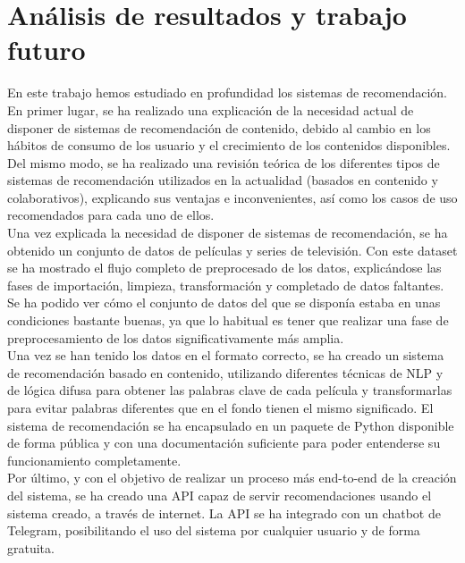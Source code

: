 \chapter{Análisis de resultados y trabajo futuro}\label{chap:resultados}

En este trabajo hemos estudiado en profundidad los sistemas de recomendación. En primer lugar, se ha realizado una explicación de la necesidad actual de disponer de sistemas de recomendación de contenido, debido al cambio en los hábitos de consumo de los usuario y el crecimiento de los contenidos disponibles. Del mismo modo, se ha realizado una revisión teórica de los diferentes tipos de sistemas de recomendación utilizados en la actualidad (basados en contenido y colaborativos), explicando sus ventajas e inconvenientes, así como los casos de uso recomendados para cada uno de ellos.\\

Una vez explicada la necesidad de disponer de sistemas de recomendación, se ha obtenido un conjunto de datos de películas y series de televisión. Con este dataset se ha mostrado el flujo completo de preprocesado de los datos, explicándose las fases de importación, limpieza, transformación y completado de datos faltantes. Se ha podido ver cómo el conjunto de datos del que se disponía estaba en unas condiciones bastante buenas, ya que lo habitual es tener que realizar una fase de preprocesamiento de los datos significativamente más amplia.\\

Una vez se han tenido los datos en el formato correcto, se ha creado un sistema de recomendación basado en contenido, utilizando diferentes técnicas de NLP y de lógica difusa para obtener las palabras clave de cada película y transformarlas para evitar palabras diferentes que en el fondo tienen el mismo significado. El sistema de recomendación se ha encapsulado en un paquete de Python disponible de forma pública y con una documentación suficiente para poder entenderse su funcionamiento completamente.\\

Por último, y con el objetivo de realizar un proceso más end-to-end de la creación del sistema, se ha creado una API capaz de servir recomendaciones usando el sistema creado, a través de internet. La API se ha integrado con un chatbot de Telegram, posibilitando el uso del sistema por cualquier usuario y de forma gratuita.\\

